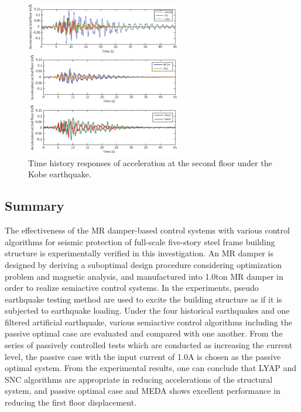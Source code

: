 \begin{figure}[!ht]
\centering
\includegraphics[width=0.6\textwidth] {figure/n3-17.eps}
\caption{Time history responses of acceleration at the second floor under the Kobe earthquake.}
\label{fig:n3-17}
\end{figure}

\subsection{Summary}
The effectiveness of the MR damper-based control systems with various control algorithms for seismic protection of full-scale five-story steel frame building structure is experimentally verified in this investigation. An MR damper is designed by deriving a suboptimal design procedure considering optimization problem and magnetic analysis, and manufactured into 1.0ton MR damper in order to realize semiactive control systems.
In the experiments, pseudo earthquake testing method are used to excite the building structure as if it is subjected to earthquake loading. Under the four historical earthquakes and one filtered artificial earthquake, various semiactive control algorithms including the passive optimal case are evaluated and compared with one another. From the series of passively controlled tests which are conducted as increasing the current level, the passive case with the input current of 1.0A is chosen as the passive optimal system. From the experimental results, one can conclude that LYAP and SNC algorithms are appropriate in reducing accelerations of the structural system, and passive optimal case and MEDA shows excellent performance in reducing the first floor displacement.